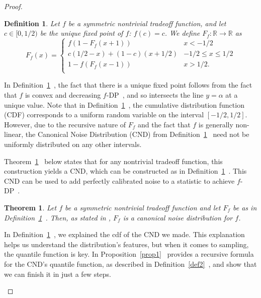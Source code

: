\documentclass{article}
\newtheorem{thm}{Theorem}
\newtheorem{defn}{Definition}
\begin{document}
\begin{proof}
\begin{enumerate}
\begin{defn} \label{def1}  %
Let $f$ be a symmetric nontrivial tradeoff function, and let {$c\in [0,1/2)$} be the unique fixed point of $f$: $f(c)=c$. 
We define $F_f:\mathbb{R}\rightarrow \mathbb{R}$ as  \[ F_f(x) = \begin{cases}
    f(1-F_f(x+1))&x<-1/2\\
    c(1/2-x) + (1-c)(x+1/2)&-1/2\leq x\leq 1/2\\
    1-f(F_f(x-1))&x>1/2.\\
\end{cases}\]
\end{defn}
In Definition~\ref{def1}~\parencite{awan2023canonical}, 
the fact that there is a unique fixed point follows from the fact that $f$ is convex and decreasing $f$-DP~\parencite{dong2019gaussian}, 
and so intersects the line $y=\alpha$ at a unique value. 
Note that in Definition~\ref{def1}~\parencite{awan2023canonical}, 
the cumulative distribution function (CDF) corresponds to a uniform random variable on the interval $[-1/2,1/2]$. 
However, due to the recursive nature of $F_f$ and the fact that $f$ is generally non-linear, 
the Canonical Noise Distribution (CND) from Definition~\ref{def1}~\parencite{awan2023canonical} need not be uniformly distributed on any other intervals.

Theorem~\ref{thm1}~\parencite{awan2023canonical} below states that for any nontrivial tradeoff function, 
this construction yields a CND, which can be constructed as in Definition~\ref{def1}~\parencite{awan2023canonical}. 
This CND can be used to add perfectly calibrated noise to a statistic to achieve $f$-DP~\parencite[Proposition~2.2]{dong2019gaussian}. 

\begin{thm} \label{thm1}  %
Let $f$ be a symmetric nontrivial tradeoff function and let $F_f$ be as in Definition~\ref{def1}~\parencite{awan2023canonical}. 
Then, as stated in \parencite[Theorem~3.9]{awan2023canonical}, $F_f$ is a canonical noise distribution for $f$. 
\end{thm}

In Definition~\ref{def1}~\parencite{awan2023canonical}, we explained the cdf of the CND we made. 
This explanation helps us understand the distribution's features, but when it comes to sampling, the quantile function is key. 
In Proposition~\ref{prop1}~\parencite{awan2023canonical} provides a recursive formula for the CND's quantile function,
as described in Definition~\ref{def2}~\parencite{awan2023canonical}, and show that we can finish it in just a few steps.


\end{enumerate}
\end{proof}
\end{document}
